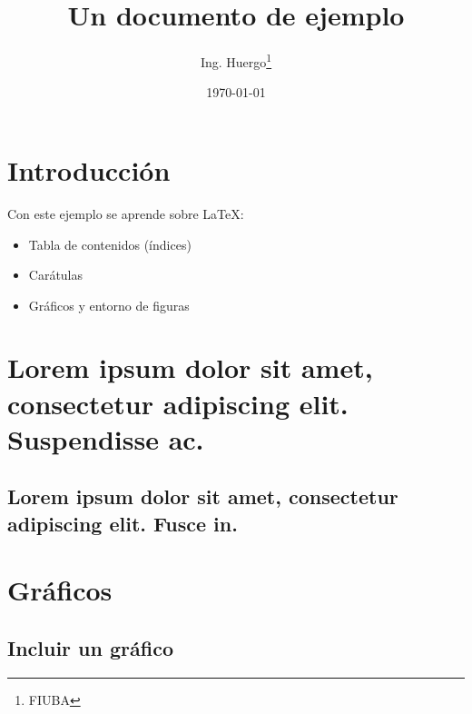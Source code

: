 \documentclass{article}
\begin{document}
\title{Un documento de ejemplo} %
\date{\today} %
\author{Ing. Huergo\thanks{FIUBA}} %

\maketitle %

\newpage %

\tableofcontents %

\newpage %

\section*{Introducción}

Con este ejemplo se aprende sobre LaTeX:

\begin{itemize}
  \item Tabla de contenidos (índices)
  \item Carátulas
  \item Gráficos y entorno de figuras
\end{itemize}

\section{Lorem ipsum dolor sit amet, consectetur adipiscing elit. Suspendisse ac.}

\subsection[Fusce in]{Lorem ipsum dolor sit amet, consectetur adipiscing elit. Fusce in.}

\section{Gráficos}

\subsection{Incluir un gráfico}
\end{document}
